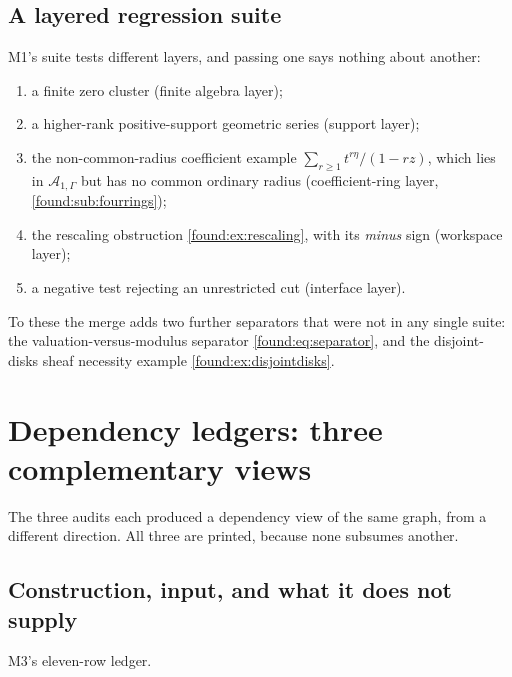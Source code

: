 \documentclass[11pt,letterpaper]{article}
\numberwithin{equation}{section}
\theoremstyle{definition}
\theoremstyle{remark}
\newcommand{\Ag}{\mathscr A}
\begin{document}
\subsection{A layered regression suite}
\label{found:app:layeredsuite}
M1's suite tests different layers, and passing one says nothing about another:
\begin{enumerate}
\item a finite zero cluster (finite algebra layer);
\item a higher-rank positive-support geometric series (support layer);
\item the non-common-radius coefficient example
$\sum_{r\ge1}t^{r\eta}/(1-rz)$, which lies in $\Ag_{1,\Gamma}$ but has no common
ordinary radius (coefficient-ring layer, \cref{found:sub:fourrings});
\item the rescaling obstruction \cref{found:ex:rescaling}, with its
\emph{minus} sign (workspace layer);
\item a negative test rejecting an unrestricted cut (interface layer).
\end{enumerate}
To these the merge adds two further separators that were not in any single
suite: the valuation-versus-modulus separator \eqref{found:eq:separator}, and
the disjoint-disks sheaf necessity example \cref{found:ex:disjointdisks}.

\section{Dependency ledgers: three complementary views}
\label{found:app:dependencies}

The three audits each produced a dependency view of the same graph, from a
different direction. All three are printed, because none subsumes another.

\subsection{Construction, input, and what it does not supply}
\label{found:app:ledgerthree}
M3's eleven-row ledger.
\end{document}
